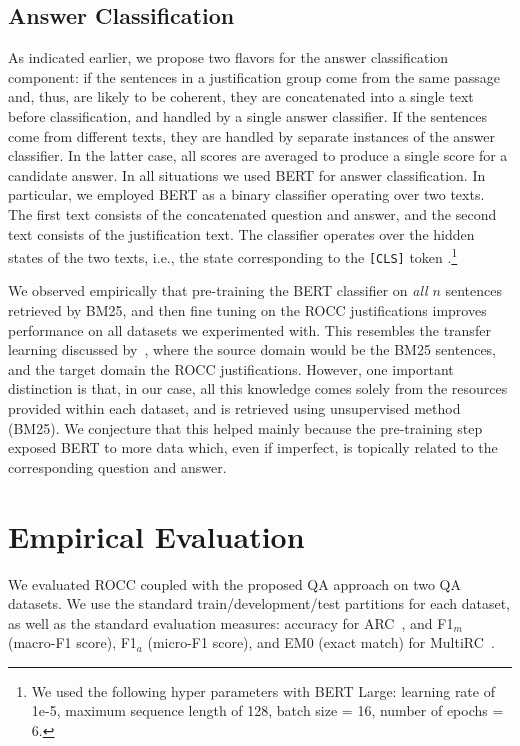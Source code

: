 \subsection{Answer Classification}
\label{sec:bert}

As indicated earlier, we propose two flavors for the answer classification component: if the sentences in a justification group come from the same passage and, thus, are likely to be coherent, they are concatenated into a single text before classification, and handled by a single answer classifier. If the sentences come from different texts, they are handled by separate instances of the answer classifier. In the latter case, all scores are averaged to produce a single score for a candidate answer. In all situations we used BERT \cite{devlin2018bert} for answer classification. In particular, we employed BERT as a binary classifier operating over two texts.  The first text consists of the concatenated question and answer, and the second text consists of the justification text. The classifier operates over the hidden states of the two texts, i.e., the state corresponding to the {\tt [CLS]} token \cite{devlin2018bert}.\footnote{We used the following hyper parameters with BERT Large: learning rate of 1e-5, maximum sequence length of 128, batch size = 16, number of epochs = 6.} 

We observed empirically that pre-training the BERT classifier on {\em all} $n$ sentences retrieved by BM25, and then fine tuning on the ROCC justifications improves performance on all datasets we experimented with. This resembles the transfer learning discussed by~\citet{howard2018universal}, where the source domain would be the BM25 sentences, and the target domain the ROCC justifications. However, one important distinction is that, in our case, all this knowledge comes solely from the resources provided within each dataset, and is retrieved using unsupervised method (BM25). We conjecture that this helped mainly because the pre-training step exposed BERT to more data which, even if imperfect, is topically related to the corresponding question and answer.

\section{Empirical Evaluation}
\label{sec:results}

We evaluated ROCC coupled with the proposed QA approach on two QA datasets. We use the standard train/development/test partitions for each dataset, as well as the standard evaluation measures: accuracy for ARC~\cite{clark2018think}, and F1${_m}$ (macro-F1 score), F1${_a}$ (micro-F1 score), and EM0 (exact match) for MultiRC~\cite{khashabi2018looking}.  

